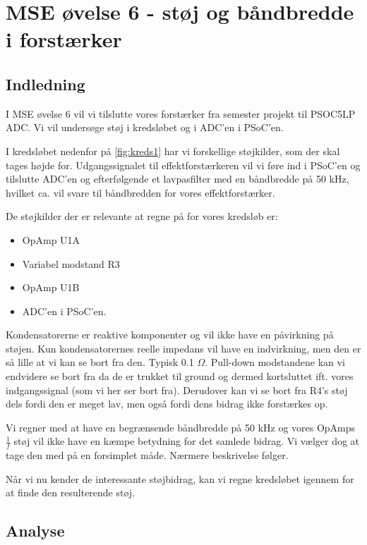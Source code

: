 \documentclass[a4paper, 11pt, article,oneside,openany]{memoir} %
\begin{document}
	
\chapter{MSE øvelse 6 - støj og båndbredde i forstærker}

\section{Indledning}
I MSE øvelse 6 vil vi tilslutte vores forstærker fra semester projekt til PSOC5LP ADC. Vi vil undersøge støj i kredsløbet og i ADC'en i PSoC'en.

I kredsløbet nedenfor på \cref{fig:kreds1} har vi forskellige støjkilder, som der skal tages højde for. Udgangssignalet til effektforstærkeren vil vi føre ind i PSoC'en og tilslutte ADC'en og efterfølgende et lavpasfilter med en båndbredde på 50 kHz, hvilket ca. vil svare til båndbredden for vores effektforstærker.

De støjkilder der er relevante at regne på for vores kredsløb er:
\begin{itemize}
	\item OpAmp U1A
	\item Variabel modstand R3
	\item OpAmp U1B
	\item ADC'en i PSoC'en.	
\end{itemize}

Kondensatorerne er reaktive komponenter og vil ikke have en påvirkning på støjen. Kun kondensatorernes reelle impedans vil have en indvirkning, men den er så lille at vi kan se bort fra den. Typisk 0.1 $\Omega$.
Pull-down modstandene kan vi endvidere se bort fra da de er trukket til ground og dermed kortsluttet ift. vores indgangssignal (som vi her ser bort fra). Derudover kan vi se bort fra R4's støj dels fordi den er meget lav, men også fordi dens bidrag ikke forstærkes op.

Vi regner med at have en begrænsende båndbredde på 50 kHz og vores OpAmps $\frac{1}{f}$ støj vil ikke have en kæmpe betydning for det samlede bidrag. Vi vælger dog at tage den med på en forsimplet måde. Nærmere beskrivelse følger.

Når vi nu kender de interessante støjbidrag, kan vi regne kredsløbet igennem for at finde den resulterende støj.


\section{Analyse}
\end{document}
